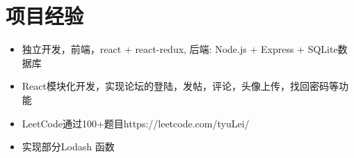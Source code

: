 \documentclass{resume}
\begin{document}


 


\section{项目经验}
\begin{itemize}
  \item 独立开发，前端，react + react-redux, 后端: Node.js + Express + SQLite数据库
  \item React模块化开发，实现论坛的登陆，发帖，评论，头像上传，找回密码等功能
  \item LeetCode通过100+题目https://leetcode.com/tyuLei/
  \item 实现部分Lodash 函数
\end{itemize}
\end{document}

